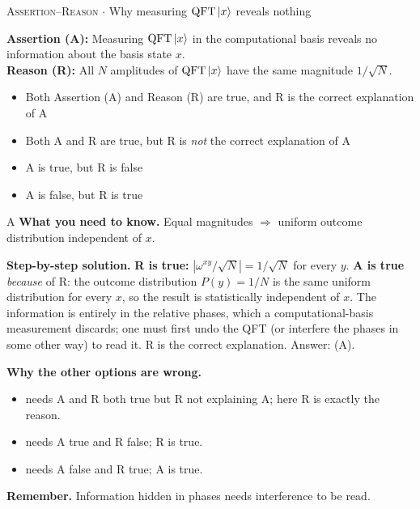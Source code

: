 \documentclass[11pt,a4paper]{article}
\newcommand{\optlabel}[1]{\textbf{(#1)}}
\newcommand{\correctlabel}[1]{\textcolor{okgreen}{\textbf{(#1)}\,\ding{51}}}
\newenvironment{qitem}[1]{\begin{list}{}{\setlength{\leftmargin}{3.3em}\setlength{\labelwidth}{3.1em}%
  \setlength{\labelsep}{0.2em}\setlength{\topsep}{3pt}\setlength{\parsep}{3pt}}\item[\textbf{Q.#1}\hfill]}{\end{list}}
\newcommand{\qsep}{\par\vspace{2pt}{\color{black!15}\hrule}\vspace{4pt}}
\newcommand{\qmeta}[2]{{\footnotesize\color{black!60}\textsc{#1} \;$\cdot$\; #2}\par}
\begin{document}
\begin{qitem}{57}
\qmeta{Assertion--Reason}{Why measuring $\mathrm{QFT}\ket{x}$ reveals nothing}
\textbf{Assertion (A):} Measuring $\mathrm{QFT}\ket{x}$ in the computational basis reveals no information about the
basis state $x$.\\[1mm]
\textbf{Reason (R):} All $N$ amplitudes of $\mathrm{QFT}\ket{x}$ have the same magnitude $1/\sqrt N$.
\begin{itemize}[leftmargin=2.6em, labelsep=0.4em, itemsep=2pt, topsep=3pt]
\item[\correctlabel{A}] Both Assertion (A) and Reason (R) are true, and R is the correct explanation of A
\item[\optlabel{B}] Both A and R are true, but R is \emph{not} the correct explanation of A
\item[\optlabel{C}] A is true, but R is false
\item[\optlabel{D}] A is false, but R is true
\end{itemize}
\end{qitem}
\begin{solbox}{A}
\textbf{\color{brand}What you need to know.} Equal magnitudes $\Rightarrow$ uniform outcome distribution independent of $x$.

\textbf{\color{brand}Step-by-step solution.} \textbf{R is true:} $|\omega^{xy}/\sqrt N| = 1/\sqrt N$ for every $y$. \textbf{A is true} \emph{because} of R: the outcome
distribution $P(y) = 1/N$ is the same uniform distribution for every $x$, so the result is statistically independent of $x$.
The information is entirely in the relative phases, which a computational-basis measurement discards; one must first
undo the QFT (or interfere the phases in some other way) to read it. R is the correct explanation. Answer: (A).

\textbf{\color{brand}Why the other options are wrong.}
\begin{itemize}[leftmargin=2.4em, itemsep=1pt, topsep=2pt]
\item[\textbf{(B)}] needs A and R both true but R not explaining A; here R is exactly the reason.
\item[\textbf{(C)}] needs A true and R false; R is true.
\item[\textbf{(D)}] needs A false and R true; A is true.
\end{itemize}
\textbf{\color{brand}Remember.} Information hidden in phases needs interference to be read.
\end{solbox}
\qsep
\end{document}
